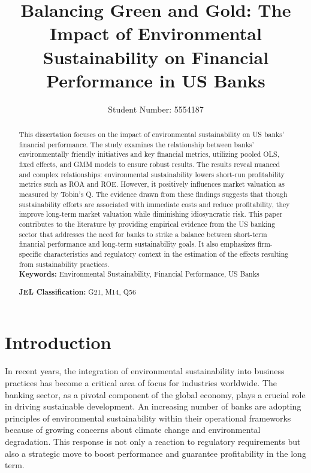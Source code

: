 \documentclass[11pt, a4paper]{article}
\title{Balancing Green and Gold: The Impact of Environmental Sustainability on Financial Performance in US Banks}
\author{Student Number: 5554187}
\date{}
\begin{document}
\maketitle
\vspace{0.2in}
\begin{abstract}
\normalsize
This dissertation focuses on the impact of environmental sustainability on US banks' financial performance. The study examines the relationship between banks' environmentally friendly initiatives and key financial metrics, utilizing pooled OLS, fixed effects, and GMM models to ensure robust results. The results reveal nuanced and complex relationships: environmental sustainability lowers short-run profitability metrics such as ROA and ROE. However, it positively influences market valuation as measured by Tobin’s Q. The evidence drawn from these findings suggests that though sustainability efforts are associated with immediate costs and reduce profitability, they improve long-term market valuation while diminishing idiosyncratic risk. This paper contributes to the literature by providing empirical evidence from the US banking sector that addresses the need for banks to strike a balance between short-term financial performance and long-term sustainability goals. It also emphasizes firm-specific characteristics and regulatory context in the estimation of the effects resulting from sustainability practices. \\

\noindent
\textbf{Keywords:} Environmental Sustainability, Financial Performance, US Banks

\noindent
\textbf{JEL Classification:} G21, M14, Q56
\end{abstract}

\newpage
\tableofcontents
{}

\newpage
\clearpage
{} 
\section{Introduction}
In recent years, the integration of environmental sustainability into business practices has become a critical area of focus for industries worldwide. The banking sector, as a pivotal component of the global economy, plays a crucial role in driving sustainable development. An increasing number of banks are adopting principles of environmental sustainability within their operational frameworks because of growing concerns about climate change and environmental degradation. This response is not only a reaction to regulatory requirements but also a strategic move to boost performance and guarantee profitability in the long term.
\end{document}

